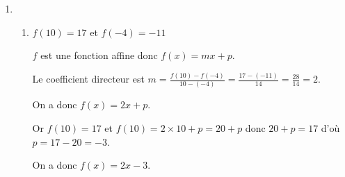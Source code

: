 %
%
%
%
\begin{exr}
  \begin{enumerate}[start=2]
  \item 
      \begin{enumerate}[start=2]
      \item $f(10)=17$ et $f(-4)=-11$

$f$ est une fonction affine donc $f(x)=mx+p$.

Le coefficient directeur est $m=\frac{f(10)-f(-4)}{10-(-4)}=\frac{17-(-11)}{14}=\frac{28}{14}=2$.

On a donc $f(x)=2x+p$.

Or $f(10)=17$ et $f(10)=2\times10+p=20+p$ donc $20+p=17$ d'où $p=17-20=-3$.

On a donc $f(x)=2x-3$.
      \end{enumerate}
 \end{enumerate}
\end{exr}%
%
%
